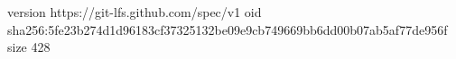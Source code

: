 version https://git-lfs.github.com/spec/v1
oid sha256:5fe23b274d1d96183cf37325132be09e9cb749669bb6dd00b07ab5af77de956f
size 428
